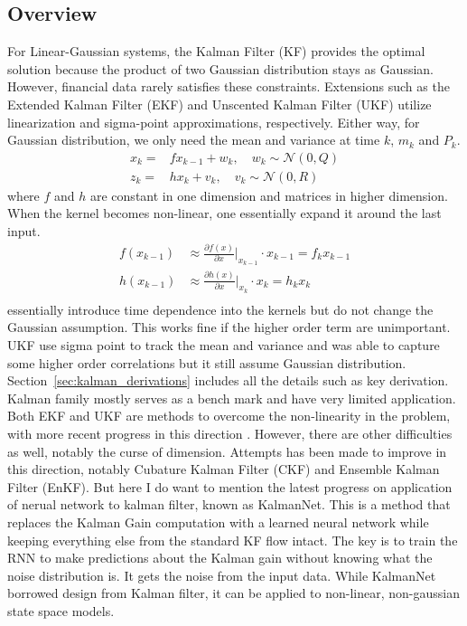 \documentclass{article}
\begin{document}
\subsection{Overview}
For Linear-Gaussian systems, the Kalman Filter (KF) provides the optimal solution because the product of two Gaussian distribution stays as Gaussian. However, financial data rarely satisfies these constraints. Extensions such as the Extended Kalman Filter (EKF) and Unscented Kalman Filter (UKF) utilize linearization and sigma-point approximations, respectively. Either way, for Gaussian distribution, we only need the mean and variance at time $k$, $m_k$ and $P_k$. 
\begin{equation}
\begin{split}
x_k =& f x_{k-1} + w_k, \quad w_k \sim \mathcal{N}(0, Q) \\
z_k =& h x_k + v_k, \quad v_k \sim \mathcal{N}(0, R)
\end{split}
\end{equation}
where $f$ and $h$ are constant in one dimension and matrices in higher dimension. When the kernel becomes non-linear, one essentially expand it around the last input. 
\begin{equation}
\begin{split}
    f(x_{k-1}) &\approx \frac{\partial f(x)}{\partial x} \Big|_{x_{k-1}} \cdot x_{k-1} =f_{k} x_{k-1} \\
    h(x_{k-1}) &\approx \frac{\partial h(x)}{\partial x} \Big|_{x_{k}} \cdot x_{k} =h_{k} x_{k} \\
\end{split}
\end{equation}
essentially introduce time dependence into the kernels but do not change the Gaussian assumption. This works fine if the higher order term are unimportant. UKF use sigma point to track the mean and variance and was able to capture some higher order correlations but it still assume Gaussian distribution. Section~\ref{sec:kalman_derivations} includes all the details such as key derivation. Kalman family mostly serves as a bench mark and have very limited application. Both EKF and UKF are methods to overcome the non-linearity in the problem, with more recent progress in this direction \cite{jiang2025new}. However, there are other difficulties as well, notably the curse of dimension. Attempts has been made to improve in this direction, notably Cubature Kalman Filter (CKF)\cite{arasaratnam2009cubature} and Ensemble Kalman Filter (EnKF)\cite{evensen-2003-ensemble-kalman-filter,alghattas2024ensemble}. But here I do want to mention the latest progress on application of nerual network to kalman filter, known as KalmanNet\cite{DBLP:journals/corr/abs-2107-10043,mortada2025recursive}. This is a method that replaces the Kalman Gain computation with a learned neural network while keeping everything else from the standard KF flow intact. The key is to train the RNN to make predictions about the Kalman gain without knowing what the noise distribution is. It gets the noise from the input data. While KalmanNet borrowed design from Kalman filter, it can be applied to non-linear, non-gaussian state space models. 
\end{document}
